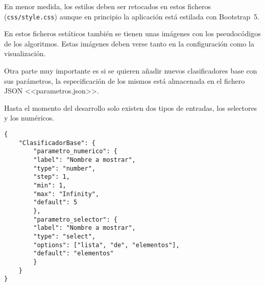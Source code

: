 \begin{figure}[H]
\end{figure}

En menor medida, los estilos deben ser retocados en estos ficheros
(\texttt{css/style.css}) aunque en principio la aplicación está estilada con
Bootstrap~5.

En estos ficheros estáticos también se tienen unas imágenes con los
pseudocódigos de los algoritmos. Estas imágenes deben verse tanto en la
configuración como la visualización.

Otra parte muy importante es si se quieren añadir nuevos clasificadores base con
sus parámetros, la especificación de los mismos está almacenada en el fichero
JSON <<parametros.json>>. 

Hasta el momento del desarrollo solo existen dos tipos de entradas, los
selectores y los numéricos.

\begin{tcolorbox}[colback=cyan!5!white,colframe=cyan!75!black,title=Estructura para añadir clasificadores y sus parámetros]
\begin{verbatim}
{
    "ClasificadorBase": {
        "parametro_numerico": {
        "label": "Nombre a mostrar",
        "type": "number",
        "step": 1,
        "min": 1,
        "max": "Infinity",
        "default": 5
        },
        "parametro_selector": {
        "label": "Nombre a mostrar",
        "type": "select",
        "options": ["lista", "de", "elementos"],
        "default": "elementos"
        }
    }
}
\end{verbatim}
\end{tcolorbox}


